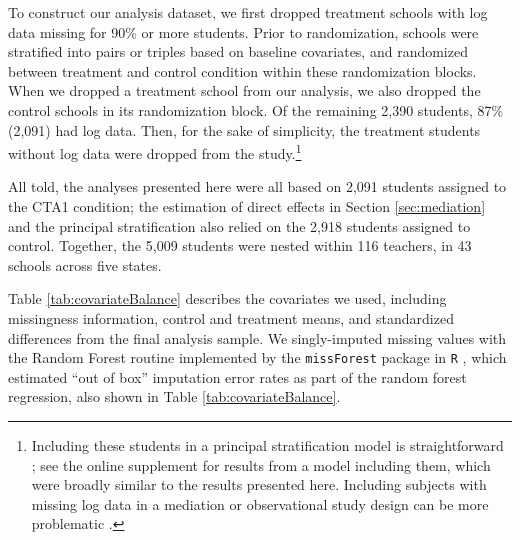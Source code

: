 \documentclass{article}\usepackage[]{graphicx}\usepackage[]{color}
\begin{document}
To construct our analysis dataset, we first dropped treatment schools with log data missing
for 90\% or more students.
Prior to randomization, schools were stratified into pairs or triples
based on baseline covariates, and randomized between treatment and
control condition within these randomization blocks.
When we dropped a treatment school from our analysis, we also dropped
the control schools in its randomization block.
Of the remaining 2,390 students, 87\% (2,091) had log
data.
Then, for the sake of simplicity, the treatment students without log data
were dropped from the study.\footnote{Including these students in a
  principal stratification model is straightforward \citep{aoas}; see
  the online supplement for results from a model including them, which
  were broadly similar to the results presented here. Including
  subjects with missing log data in a mediation or observational study
  design can be more problematic \citep[see, e.g.][]{li2017identifiability}.}

All told, the analyses presented here were all based on 2,091 students assigned to the CTA1 condition; the estimation of direct effects in Section \ref{sec:mediation} and the principal stratification also relied on the 2,918 students assigned to control.
Together, the 5,009 students were nested within 116 teachers, in 43 schools across five states.


Table \ref{tab:covariateBalance} describes the covariates we used, including
missingness information, control and treatment means, and standardized
differences \citep[c.f.][]{kalton1968standardization} from the final
analysis sample.
We singly-imputed missing values with the Random Forest routine implemented
by the \texttt{missForest} package in \texttt{R}
\citep{missForest,rcite},  which estimated ``out of box'' imputation
error rates as part of the random forest regression, also shown in Table \ref{tab:covariateBalance}.

\begin{table}[ht]
\centering

\caption{Missingness information, control (``BaU'' or ``Business as
  Usual'') and treatment (``CTA1'') means, and balance for the
  covariates included in this study, from the high school year two
  stratum of CTA1 Effectiveness experiment. Imputation error is percent falsely classified for
  categorical variables (Race/Ethnicity, Sex, and Special Education)
  and standardized root mean squared error for Pretest, which is
  continuous. %
  Analysis done in \texttt{R} via \texttt{RItools} \citep{ritools}.}
\label{tab:covariateBalance}
\end{table}
\end{document}
